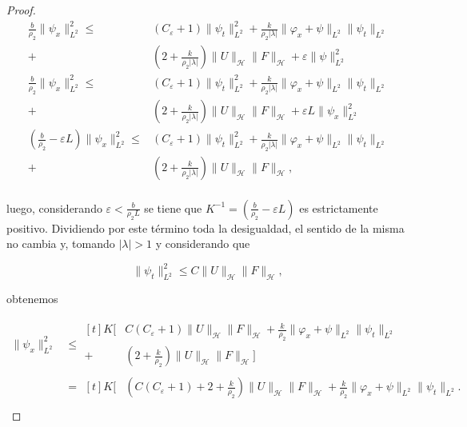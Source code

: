\begin{proof}
    \begin{align*}
        \frac{b}{\rho_2} \lVert \psi_x \rVert_{L^2}^2 \leq &\left(C_{\varepsilon} + 1\right)\lVert \psi_t \rVert_{L^2}^2 + \frac{k}{\rho_2 \lvert \lambda \lvert} \lVert \varphi_x + \psi\rVert_{L^2} \lVert \psi_t \rVert_{L^2}\\
        +& \left(2 + \frac{k}{\rho_2 \lvert \lambda \rvert} \right)\lVert U \rVert_{\mathcal{H}} \lVert F \rVert_{\mathcal{H}} + \varepsilon \lVert \psi \rVert_{L^2}^2\\
        \frac{b}{\rho_2} \lVert \psi_x \rVert_{L^2}^2 \leq& \left(C_{\varepsilon} + 1\right)\lVert \psi_t \rVert_{L^2}^2 + \frac{k}{\rho_2 \lvert \lambda \lvert} \lVert \varphi_x + \psi\rVert_{L^2} \lVert \psi_t \rVert_{L^2}\\
        +& \left(2 + \frac{k}{\rho_2 \lvert \lambda \rvert} \right)\lVert U \rVert_{\mathcal{H}} \lVert F \rVert_{\mathcal{H}} + \varepsilon L \lVert \psi_x \rVert_{L^2}^2\\
        \left(\frac{b}{\rho_2} - \varepsilon L\right)\lVert \psi_x \rVert_{L^2}^2 \leq& \left(C_{\varepsilon} + 1\right)\lVert \psi_t \rVert_{L^2}^2 + \frac{k}{\rho_2 \lvert \lambda \lvert} \lVert \varphi_x + \psi\rVert_{L^2} \lVert \psi_t \rVert_{L^2}\\
        +& \left(2 + \frac{k}{\rho_2 \lvert \lambda \rvert} \right)\lVert U \rVert_{\mathcal{H}} \lVert F \rVert_{\mathcal{H}},\\
    \end{align*}

    luego, considerando $\varepsilon < \frac{b}{\rho_2 L}$ se tiene que $K^{-1}=\left(\frac{b}{\rho_2} - \varepsilon L \right)$ es estrictamente positivo. Dividiendo por este término toda la desigualdad, el sentido de la misma no cambia y, tomando $\lvert \lambda \rvert > 1$ y considerando que

    \[\lVert \psi_t \rVert_{L^2}^2 \leq C \lVert U \rVert_{\mathcal{H}} \lVert F \rVert_{\mathcal{H}}, \]

    obtenemos

    \begin{align*}
        \lVert \psi_x \rVert_{L^2}^2 &\leq 
        \begin{aligned}[t]
            K \Bigg[ &C\left(C_{\varepsilon} + 1\right)\lVert U \rVert_{\mathcal{H}} \lVert F \rVert_{\mathcal{H}} + \frac{k}{\rho_2} \lVert \varphi_x + \psi\rVert_{L^2} \lVert \psi_t \rVert_{L^2}\\
            + &\left(2 + \frac{k}{\rho_2} \right)\lVert U \rVert_{\mathcal{H}} \lVert F \rVert_{\mathcal{H}} \Bigg]
        \end{aligned}\\
        &=
        \begin{aligned}[t]
            K \Bigg[ &\left(C\left(C_{\varepsilon} + 1\right) + 2 + \frac{k}{\rho_2}\right)\lVert U \rVert_{\mathcal{H}} \lVert F \rVert_{\mathcal{H}} + \frac{k}{\rho_2} \lVert \varphi_x + \psi\rVert_{L^2} \lVert \psi_t \rVert_{L^2}.
        \end{aligned}\\
    \end{align*}


\end{proof}
